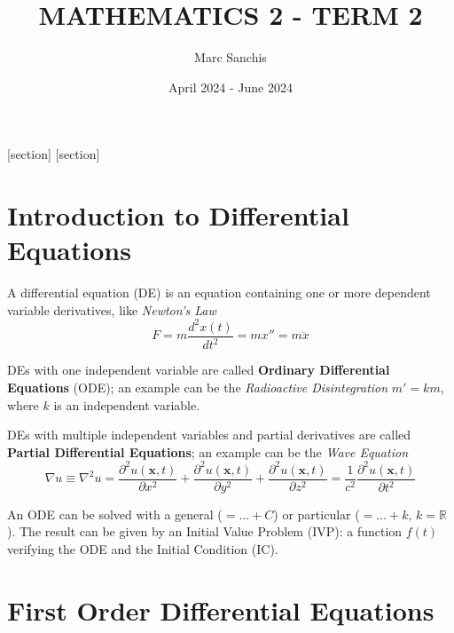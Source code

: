 \documentclass[a4paper]{article}
\title{MATHEMATICS 2 - TERM 2}
\author{Marc Sanchis}
\date{April 2024 - June 2024}
\begin{document}
\maketitle

\renewcommand{\contentsname}{}
\tableofcontents

\newpage
\restoregeometry
\pagestyle{fancy}
\setcounter{section}{5}

[section]
[section]
\setcounter{ex}{0}
\setcounter{prob}{0}

\section{Introduction to Differential Equations}
\setcounter{equation}{0}

A differential equation (DE) is an equation containing one or more dependent variable derivatives, like \textit{Newton's Law}
$$
F=m \frac{d^{2}x(t)}{dt^{2}}=mx''=m\ddot{x}
$$

DEs with one independent variable are called \textbf{Ordinary Differential Equations} (ODE); an example can be the \textit{Radioactive Disintegration} $m'=km$, where $k$ is an independent variable.

DEs with multiple independent variables and partial derivatives are called \textbf{Partial Differential Equations}; an example can be the \textit{Wave Equation}
$$
\nabla u\equiv\nabla^{2}u=\frac{\partial^{2}u(\mathbf{x}, t)}{\partial x^{2}}+\frac{\partial^{2}u(\mathbf{x},t)}{\partial y^{2}}+\frac{\partial^{2}u(\mathbf{x},t)}{\partial z^{2}}=\frac{1}{c^{2}}\frac{\partial^{2}u(\mathbf{x},t)}{\partial t^{2}}
$$

\vspace{1ex}\vspace{1ex}

An ODE can be solved with a general ($=\dots+C$) or particular ($=\dots+k,\,k=\mathbb{R}$). The result can be given by an Initial Value Problem (IVP): a function $f(t)$ verifying the ODE and the Initial Condition (IC).

\vspace{1ex}\vspace{1ex}

\section{First Order Differential Equations}
\setcounter{equation}{0}
\end{document}
